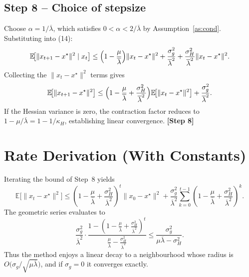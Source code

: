 \documentclass[11pt]{article}
\begin{document}
\subsection*{Step 8 – Choice of stepsize}
Choose $\alpha=1/\overline{\lambda}$, which satisfies $0<\alpha<2/\overline{\lambda}$
by Assumption~\ref{as:cond}.  Substituting into (14):
\[
\mathbb{E}\!\bigl[\|x_{t+1}-x^{\star}\|^{2}\mid x_{t}\bigr]
\le\Bigl(1-\frac{\mu}{\overline{\lambda}}\Bigr)\|x_{t}-x^{\star}\|^{2}
+\frac{\sigma_{g}^{2}}{\overline{\lambda}^{2}}
+\frac{\sigma_{H}^{2}}{\overline{\lambda}^{2}}\|x_{t}-x^{\star}\|^{2}.
\]
Collecting the $\|x_{t}-x^{\star}\|^{2}$ terms gives
\[
\mathbb{E}\!\bigl[\|x_{t+1}-x^{\star}\|^{2}\bigr]
\le\Bigl(1-\frac{\mu}{\overline{\lambda}}+\frac{\sigma_{H}^{2}}{\overline{\lambda}^{2}}\Bigr)
\mathbb{E}\!\bigl[\|x_{t}-x^{\star}\|^{2}\bigr]
+\frac{\sigma_{g}^{2}}{\overline{\lambda}^{2}}.
\]
If the Hessian variance is zero, the contraction factor reduces to
$1-\mu/\overline{\lambda}=1-1/\kappa_{H}$, establishing linear convergence.
\textbf{[Step 8]}

\section{Rate Derivation (With Constants)}
Iterating the bound of Step~8 yields
\[
\mathbb{E}\!\bigl[\|x_{t}-x^{\star}\|^{2}\bigr]
\le\left(1-\frac{\mu}{\overline{\lambda}}+\frac{\sigma_{H}^{2}}{\overline{\lambda}^{2}}\right)^{t}
\|x_{0}-x^{\star}\|^{2}
+\frac{\sigma_{g}^{2}}{\overline{\lambda}^{2}}
\sum_{k=0}^{t-1}\left(1-\frac{\mu}{\overline{\lambda}}+\frac{\sigma_{H}^{2}}{\overline{\lambda}^{2}}\right)^{k}.
\]
The geometric series evaluates to
\[
\frac{\sigma_{g}^{2}}{\overline{\lambda}^{2}}
\cdot\frac{1-\left(1-\frac{\mu}{\overline{\lambda}}+\frac{\sigma_{H}^{2}}{\overline{\lambda}^{2}}\right)^{t}}
{\frac{\mu}{\overline{\lambda}}-\frac{\sigma_{H}^{2}}{\overline{\lambda}^{2}}}
\le\frac{\sigma_{g}^{2}}{\mu\overline{\lambda}-\sigma_{H}^{2}} .
\]
Thus the method enjoys a linear decay to a neighbourhood whose radius is
$O\!\bigl(\sigma_{g}/\sqrt{\mu\overline{\lambda}}\bigr)$, and if $\sigma_{g}=0$ it
converges exactly.
\end{document}
